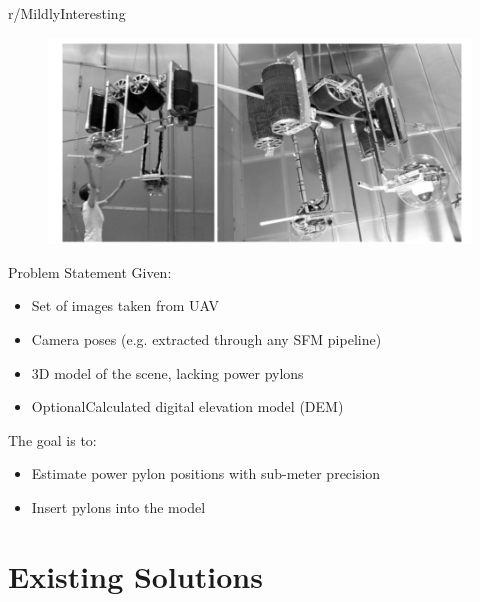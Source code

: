 \documentclass{beamer}
\begin{document}
\begin{frame}[t, fragile]{r/MildlyInteresting}
\begin{figure}
\includegraphics[scale=0.33]{canuimagine}
\end{figure}
\end{frame}

\begin{frame}[t, fragile]{Problem Statement}
Given:
\begin{itemize}
\item Set of images taken from UAV
\item Camera poses (e.g. extracted through any SFM pipeline)
\item 3D model of the scene, lacking power pylons
\item \lbrack Optional\rbrack  Calculated digital elevation model (DEM)
\end{itemize}
The goal is to:
\begin{itemize}
\item Estimate power pylon positions with sub-meter precision
\item Insert pylons into the model
\end{itemize}
\end{frame}

\section{Existing Solutions}
\end{document}
